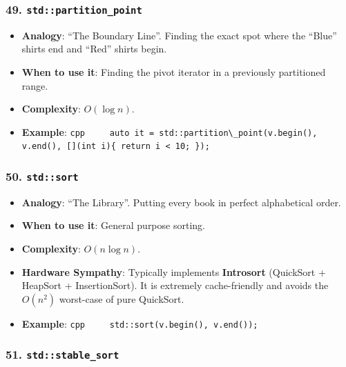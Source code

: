 \hypertarget{stdpartition_point}{%
\subsubsection{\texorpdfstring{49.
\texttt{std::partition\_point}}{49. std::partition\_point}}\label{stdpartition_point}}

\begin{itemize}
\tightlist
\item
  \textbf{Analogy}: ``The Boundary Line''. Finding the exact spot where
  the ``Blue'' shirts end and ``Red'' shirts begin.
\item
  \textbf{When to use it}: Finding the pivot iterator in a previously
  partitioned range.
\item
  \textbf{Complexity}: \(O(\log n)\).
\item
  \textbf{Example}:
  \passthrough{\lstinline!cpp     auto it = std::partition\_point(v.begin(), v.end(), [](int i)\{ return i < 10; \});!}
\end{itemize}

\hypertarget{stdsort}{%
\subsubsection{\texorpdfstring{50.
\texttt{std::sort}}{50. std::sort}}\label{stdsort}}

\begin{itemize}
\tightlist
\item
  \textbf{Analogy}: ``The Library''. Putting every book in perfect
  alphabetical order.
\item
  \textbf{When to use it}: General purpose sorting.
\item
  \textbf{Complexity}: \(O(n \log n)\).
\item
  \textbf{Hardware Sympathy}: Typically implements \textbf{Introsort}
  (QuickSort + HeapSort + InsertionSort). It is extremely cache-friendly
  and avoids the \(O(n^2)\) worst-case of pure QuickSort.
\item
  \textbf{Example}:
  \passthrough{\lstinline!cpp     std::sort(v.begin(), v.end());!}
\end{itemize}

\hypertarget{stdstable_sort}{%
\subsubsection{\texorpdfstring{51.
\texttt{std::stable\_sort}}{51. std::stable\_sort}}\label{stdstable_sort}}

